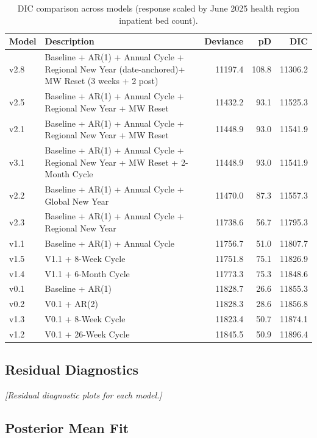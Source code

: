 \documentclass[
]{article}
\begin{document}
\begin{table}[!h]
\centering
\caption{\label{tab:spine-dic-bed-count}DIC comparison across models (response scaled by June 2025 health region inpatient bed count).}
\centering
\begin{tabular}[t]{llrrr}
\toprule
Model & Description & Deviance & pD & DIC\\
\midrule
v2.8 & Baseline + AR(1) + Annual Cycle + Regional New Year (date-anchored)+ MW Reset (3 weeks + 2 post) & 11197.4 & 108.8 & 11306.2\\
v2.5 & Baseline + AR(1) + Annual Cycle + Regional New Year + MW Reset & 11432.2 & 93.1 & 11525.3\\
v2.1 & Baseline + AR(1) + Annual Cycle + Regional New Year + MW Reset & 11448.9 & 93.0 & 11541.9\\
v3.1 & Baseline + AR(1) + Annual Cycle + Regional New Year + MW Reset + 2-Month Cycle & 11448.9 & 93.0 & 11541.9\\
v2.2 & Baseline + AR(1) + Annual Cycle + Global New Year & 11470.0 & 87.3 & 11557.3\\
\addlinespace
v2.3 & Baseline + AR(1) + Annual Cycle +  Regional New Year & 11738.6 & 56.7 & 11795.3\\
v1.1 & Baseline + AR(1) + Annual Cycle & 11756.7 & 51.0 & 11807.7\\
v1.5 & V1.1 + 8-Week Cycle & 11751.8 & 75.1 & 11826.9\\
v1.4 & V1.1 + 6-Month Cycle & 11773.3 & 75.3 & 11848.6\\
v0.1 & Baseline + AR(1) & 11828.7 & 26.6 & 11855.3\\
\addlinespace
v0.2 & V0.1 + AR(2) & 11828.3 & 28.6 & 11856.8\\
v1.3 & V0.1 + 8-Week Cycle & 11823.4 & 50.7 & 11874.1\\
v1.2 & V0.1 + 26-Week Cycle & 11845.5 & 50.9 & 11896.4\\
\bottomrule
\end{tabular}
\end{table}

\subsection{Residual Diagnostics}\label{app:residuals}

\textit{[Residual diagnostic plots for each model.]}

\subsection{Posterior Mean Fit}\label{app:mu-plots}
\end{document}
